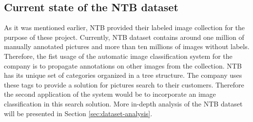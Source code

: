 \subsection{Current state of the NTB dataset}
As it was mentioned earlier, NTB provided their labeled image collection for the purpose of these project. Currently, NTB dataset contains around one million of manually annotated pictures and more than ten millions of images without labels. Therefore, the fist usage of the automatic image classification system for the company is to propagate annotations on other images from the collection. NTB has its unique set of categories organized in a tree structure. The company uses these tags to provide a solution for pictures search to their customers. Therefore the second application of the system would be to incorporate an image classification in this search solution. More in-depth analysis of the NTB dataset will be presented in Section \ref{sec:dataset-analysis}.

